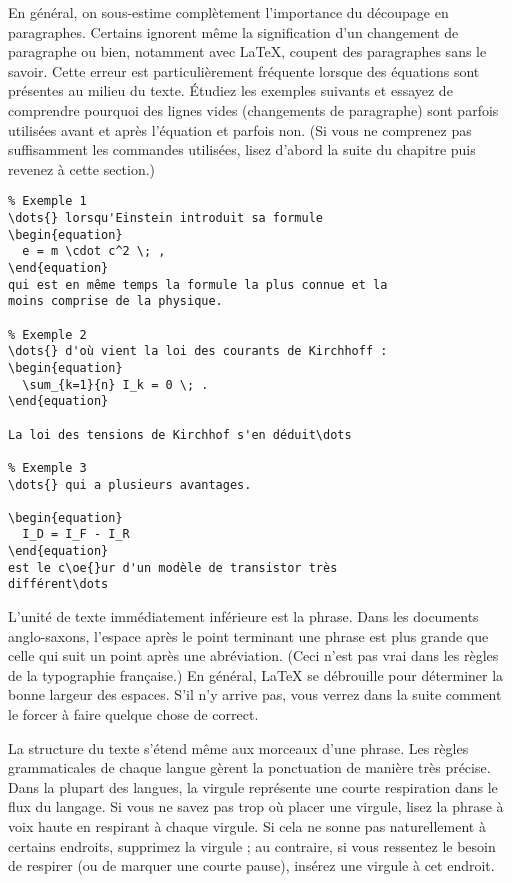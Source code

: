 En général, on sous-estime complètement l'importance du découpage en
paragraphes. Certains ignorent même la signification d'un changement
de paragraphe ou bien, notamment avec \LaTeX{}, coupent des paragraphes
sans le savoir. Cette erreur est particulièrement fréquente lorsque
des équations sont présentes au milieu du texte. Étudiez les exemples
suivants et essayez de comprendre pourquoi des lignes vides
(changements de paragraphe) sont parfois utilisées avant et après
l'équation et parfois non. (Si vous ne comprenez pas suffisamment les
commandes utilisées, lisez d'abord la suite du chapitre puis revenez à
cette section.)

\begin{code}
\begin{verbatim}
% Exemple 1
\dots{} lorsqu'Einstein introduit sa formule
\begin{equation}
  e = m \cdot c^2 \; ,
\end{equation}
qui est en même temps la formule la plus connue et la
moins comprise de la physique.

% Exemple 2
\dots{} d'où vient la loi des courants de Kirchhoff :
\begin{equation}
  \sum_{k=1}{n} I_k = 0 \; .
\end{equation}

La loi des tensions de Kirchhof s'en déduit\dots

% Exemple 3
\dots{} qui a plusieurs avantages.

\begin{equation}
  I_D = I_F - I_R
\end{equation}
est le c\oe{}ur d'un modèle de transistor très
différent\dots
\end{verbatim}
\end{code}

L'unité de texte immédiatement inférieure est la phrase. Dans les
documents anglo-saxons, l'espace après le point terminant une phrase
est plus grande que celle qui suit un point après une
abréviation. (Ceci n'est pas vrai dans les règles de la typographie
française.) En général, \LaTeX{} se débrouille pour déterminer la
bonne largeur des espaces. S'il n'y arrive pas, vous verrez dans la
suite comment le forcer à faire quelque chose de correct.

La structure du texte s'étend même aux morceaux d'une phrase. Les
règles grammaticales de chaque langue gèrent la ponctuation de
manière très précise. Dans la plupart des langues, la virgule
représente une courte respiration dans le flux du langage. Si vous ne
savez pas trop où placer une virgule, lisez la phrase à voix haute en
respirant à chaque virgule. Si cela ne sonne pas naturellement à
certains endroits, supprimez la virgule ; au contraire, si vous
ressentez le besoin de respirer (ou de marquer une courte pause),
insérez une virgule à cet endroit.

